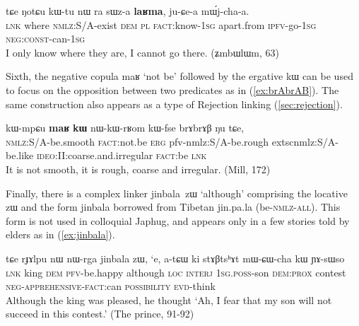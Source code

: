 \documentclass[oldfontcommands,oneside,a4paper,11pt]{article}
\newcommand{\ipa}[1]{{\phon \mbox{#1}}} %
\newcommand{\refb}[1]{(\ref{#1})}
\begin{document}
 \begin{exe}
\ex \label{ex:sWza.laRma}
\gll
 \ipa{tɕe}  	\ipa{ŋotɕu}  	\ipa{kɯ-tu}  	\ipa{nɯ} \ipa{ra}  	\ipa{sɯz-a}  	\ipa{\textbf{laʁma},}  	\ipa{ju-ɕe-a}  	\ipa{mɯ́j-cha-a.}  	\\
 \textsc{lnk} where \textsc{nmlz}:S/A-exist \textsc{dem} \textsc{pl} \textsc{fact}:know-\textsc{1sg} apart.from \textsc{ipfv}-go-\textsc{1sg} \textsc{neg:const}-can-\textsc{1sg}\\
\glt I only know where they are, I cannot go there. (ʑmbɯlɯm, 63)
\end{exe}
Sixth, the negative copula \ipa{maʁ}  `not be' followed by the ergative \ipa{kɯ} can be used to focus on the opposition between two predicates as in \refb{ex:brAbrAB}. The same construction also appears as a type of Rejection linking \refb{sec:rejection}.
\begin{exe}
\ex \label{ex:brAbrAB}
\gll
\ipa{kɯ-mpɕu}  	\ipa{\textbf{maʁ}}  	\ipa{\textbf{kɯ}}  	\ipa{nɯ-kɯ-rʁom}  	\ipa{kɯ-fse}  	\ipa{brɤbrɤβ}  	\ipa{ŋu}  	\ipa{tɕe,}  \\
\textsc{nmlz:S/A}-be.smooth \textsc{fact}:not.be \textsc{erg}   {pfv-nmlz:S/A}-be.rough extsc{nmlz:S/A}-be.like \textsc{ideo}:II:coarse.and.irregular \textsc{fact}:be  \textsc{lnk} \\
\glt It is not smooth, it is rough, coarse and irregular. (Mill, 172)
\end{exe}

Finally, there is a complex linker \ipa{jinbala zɯ} `although' comprising the locative \ipa{zɯ} and the form \ipa{jinbala} borrowed from Tibetan \ipa{jin.pa.la} (be-\textsc{nmlz-all}). This form is not used in colloquial Japhug, and appears only in a few stories told by elders as in \refb{ex:jinbala}.

\begin{exe}
\ex \label{ex:jinbala}
\gll 
\ipa{tɕe}  	\ipa{rɟɤlpu}  	\ipa{nɯ}  	\ipa{nɯ-rga}  	\ipa{jinbala}  	\ipa{zɯ,}  	\ipa{`e,}  	\ipa{a-tɕɯ}  	\ipa{ki}  	\ipa{stɤβtsʰɤt}  	\ipa{mɯ-ɕɯ-cha}  	\ipa{kɯ}  	\ipa{ɲɤ-sɯso}  \\
\textsc{lnk} king \textsc{dem} \textsc{pfv}-be.happy although \textsc{loc} \textsc{interj} \textsc{1sg.poss}-son \textsc{dem:prox} contest \textsc{neg-apprehensive-fact}:can \textsc{possibility} \textsc{evd}-think \\
\glt Although the king was pleased, he thought `Ah, I fear that my son will not succeed in this contest.' (The prince, 91-92)
 \end{exe}
\end{document}
